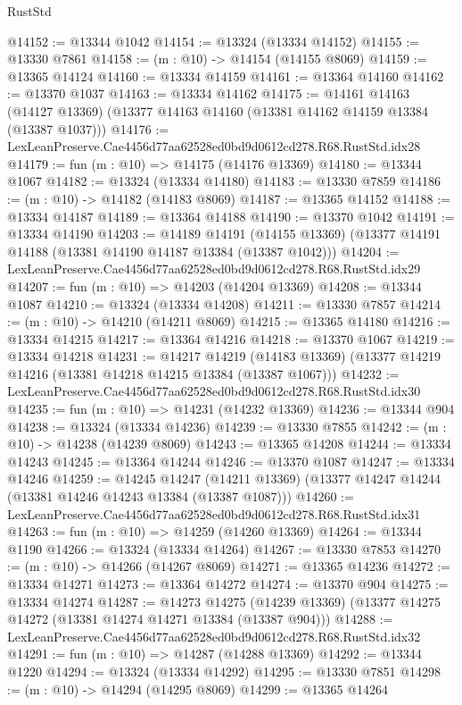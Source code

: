 \begin{lexlean}{RustStd}
\begin{coremodule}
@14152 := @13344 @1042
@14154 := @13324 (@13334 @14152)
@14155 := @13330 @7861
@14158 := (m : @10) -> @14154 (@14155 @8069)
@14159 := @13365 @14124
@14160 := @13334 @14159
@14161 := @13364 @14160
@14162 := @13370 @1037
@14163 := @13334 @14162
@14175 := @14161
    @14163
    (@14127 @13369)
    (@13377 @14163 @14160 (@13381 @14162 @14159 @13384 (@13387 @1037)))
@14176 := LexLeanPreserve.Cae4456d77aa62528ed0bd9d0612cd278.R68.RustStd.idx28
@14179 := fun (m : @10) => @14175 (@14176 @13369)
@14180 := @13344 @1067
@14182 := @13324 (@13334 @14180)
@14183 := @13330 @7859
@14186 := (m : @10) -> @14182 (@14183 @8069)
@14187 := @13365 @14152
@14188 := @13334 @14187
@14189 := @13364 @14188
@14190 := @13370 @1042
@14191 := @13334 @14190
@14203 := @14189
    @14191
    (@14155 @13369)
    (@13377 @14191 @14188 (@13381 @14190 @14187 @13384 (@13387 @1042)))
@14204 := LexLeanPreserve.Cae4456d77aa62528ed0bd9d0612cd278.R68.RustStd.idx29
@14207 := fun (m : @10) => @14203 (@14204 @13369)
@14208 := @13344 @1087
@14210 := @13324 (@13334 @14208)
@14211 := @13330 @7857
@14214 := (m : @10) -> @14210 (@14211 @8069)
@14215 := @13365 @14180
@14216 := @13334 @14215
@14217 := @13364 @14216
@14218 := @13370 @1067
@14219 := @13334 @14218
@14231 := @14217
    @14219
    (@14183 @13369)
    (@13377 @14219 @14216 (@13381 @14218 @14215 @13384 (@13387 @1067)))
@14232 := LexLeanPreserve.Cae4456d77aa62528ed0bd9d0612cd278.R68.RustStd.idx30
@14235 := fun (m : @10) => @14231 (@14232 @13369)
@14236 := @13344 @904
@14238 := @13324 (@13334 @14236)
@14239 := @13330 @7855
@14242 := (m : @10) -> @14238 (@14239 @8069)
@14243 := @13365 @14208
@14244 := @13334 @14243
@14245 := @13364 @14244
@14246 := @13370 @1087
@14247 := @13334 @14246
@14259 := @14245
    @14247
    (@14211 @13369)
    (@13377 @14247 @14244 (@13381 @14246 @14243 @13384 (@13387 @1087)))
@14260 := LexLeanPreserve.Cae4456d77aa62528ed0bd9d0612cd278.R68.RustStd.idx31
@14263 := fun (m : @10) => @14259 (@14260 @13369)
@14264 := @13344 @1190
@14266 := @13324 (@13334 @14264)
@14267 := @13330 @7853
@14270 := (m : @10) -> @14266 (@14267 @8069)
@14271 := @13365 @14236
@14272 := @13334 @14271
@14273 := @13364 @14272
@14274 := @13370 @904
@14275 := @13334 @14274
@14287 := @14273
    @14275
    (@14239 @13369)
    (@13377 @14275 @14272 (@13381 @14274 @14271 @13384 (@13387 @904)))
@14288 := LexLeanPreserve.Cae4456d77aa62528ed0bd9d0612cd278.R68.RustStd.idx32
@14291 := fun (m : @10) => @14287 (@14288 @13369)
@14292 := @13344 @1220
@14294 := @13324 (@13334 @14292)
@14295 := @13330 @7851
@14298 := (m : @10) -> @14294 (@14295 @8069)
@14299 := @13365 @14264

\end{coremodule}
\end{lexlean}
